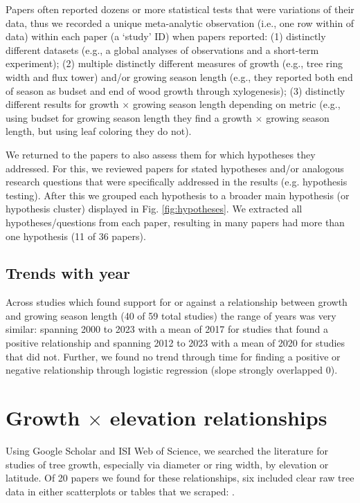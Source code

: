 \documentclass[11pt]{article}
\begin{document}
Papers often reported dozens or more statistical tests that were variations of their data, thus we recorded a unique meta-analytic observation (i.e., one row within of data) within each paper (a `study' ID) when papers reported: (1) distinctly different datasets (e.g., a global analyses of observations and a short-term experiment); (2) multiple distinctly different measures of growth (e.g., tree ring width and flux tower) and/or growing season length (e.g., they reported both end of season as budset and end of wood growth through xylogenesis); (3) distinctly different results for growth $\times$  growing season length depending on metric (e.g., using budset for growing season length they find a growth $\times$ growing season length, but using leaf coloring they do not). 

We returned to the papers to also assess them for which hypotheses they addressed. For this, we reviewed papers for stated hypotheses and/or analogous research questions that were specifically addressed in the results (e.g. hypothesis testing).  After this we grouped each hypothesis to a broader main hypothesis (or hypothesis cluster) displayed in Fig. \ref{fig:hypotheses}. We extracted all hypotheses/questions from each paper, resulting in many papers had more than one hypothesis (11 of 36 papers). 

\subsection*{Trends with year}
Across studies which found support for or against a relationship between growth and growing season length (40 of 59 total studies) the range of years was very similar: spanning 2000 to 2023 with a mean of 2017 for studies that found a positive relationship and spanning 2012 to 2023 with a mean of 2020 for studies that did not. Further, we found no trend through time for finding a positive or negative relationship through logistic regression (slope strongly overlapped 0). 

\section{Growth $\times$ elevation relationships}

Using Google Scholar and ISI Web of Science, we searched the literature for studies of tree growth, especially via diameter or ring width, by elevation or latitude. Of 20 papers we found for these relationships, six included clear raw tree data in either scatterplots or tables that we scraped: \citet{oleksyn1998growth,huang2010radial,cavin2017highest,wang2017climatic,zhu2018spatial,zhou2022altitudinal}. 
\end{document}
